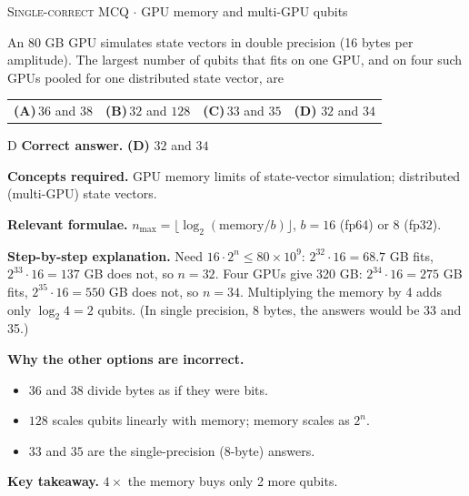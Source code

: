 \documentclass[11pt,a4paper]{article}
\newcommand{\optlabel}[1]{\textbf{(#1)}}
\newcommand{\correctlabel}[1]{\textcolor{okgreen}{\textbf{(#1)}\,\ding{51}}}
\newenvironment{qitem}[1]{\begin{list}{}{\setlength{\leftmargin}{3.3em}\setlength{\labelwidth}{3.1em}%
  \setlength{\labelsep}{0.2em}\setlength{\topsep}{3pt}\setlength{\parsep}{3pt}}\item[\textbf{Q.#1}\hfill]}{\end{list}}
\newcommand{\qsep}{\par\vspace{2pt}{\color{black!15}\hrule}\vspace{4pt}}
\newcommand{\qmeta}[2]{{\footnotesize\color{black!60}\textsc{#1} \;$\cdot$\; #2}\par}
\begin{document}
\begin{qitem}{65}
\qmeta{Single-correct MCQ}{GPU memory and multi-GPU qubits}
An 80 GB GPU simulates state vectors in double precision (16 bytes per amplitude). The largest number of qubits that
fits on one GPU, and on four such GPUs pooled for one distributed state vector, are
\par\smallskip\noindent\begin{tabularx}{\linewidth}{@{}*{4}{L}@{}}
\optlabel{A}\,$36$ and $38$ & \optlabel{B}\,$32$ and $128$ & \optlabel{C}\,$33$ and $35$ & \correctlabel{D}\,$32$ and $34$
\end{tabularx}
\end{qitem}
\begin{solbox}{D}
\textbf{\color{brand}Correct answer.} \textcolor{okgreen}{\textbf{(D)}} $32$ and $34$

\textbf{\color{brand}Concepts required.} GPU memory limits of state-vector simulation; distributed (multi-GPU) state vectors.

\textbf{\color{brand}Relevant formulae.} $n_{\max} = \lfloor\log_2(\text{memory}/b)\rfloor$, $b = 16$ (fp64) or $8$ (fp32).

\textbf{\color{brand}Step-by-step explanation.} Need $16\cdot2^n \le 80\times10^9$: $2^{32}\cdot16 = 68.7$ GB fits, $2^{33}\cdot16 = 137$ GB does not, so $n = 32$.
Four GPUs give 320 GB: $2^{34}\cdot16 = 275$ GB fits, $2^{35}\cdot16 = 550$ GB does not, so $n = 34$. Multiplying the memory by 4
adds only $\log_2 4 = 2$ qubits. (In single precision, 8 bytes, the answers would be 33 and 35.)

\textbf{\color{brand}Why the other options are incorrect.}
\begin{itemize}[leftmargin=2.4em, itemsep=1pt, topsep=2pt]
\item[\textbf{(A)}] $36$ and $38$ divide bytes as if they were bits.
\item[\textbf{(B)}] $128$ scales qubits linearly with memory; memory scales as $2^n$.
\item[\textbf{(C)}] $33$ and $35$ are the single-precision (8-byte) answers.
\end{itemize}
\textbf{\color{brand}Key takeaway.} $4\times$ the memory buys only 2 more qubits.
\end{solbox}
\qsep
\end{document}
